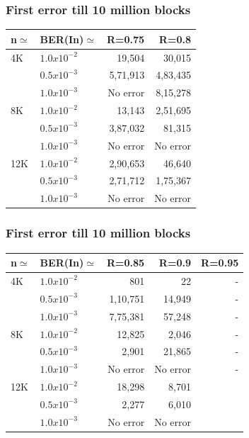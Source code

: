 \documentclass[xcolor=dvipsname]
{beamer}
\begin{document}
\begin{frame}[t] 
\frametitle{First error till 10 million blocks}

\begin{table}[]
\centering
\begin{tabular}{|l|l|r|r|}
\hline
n$\simeq$   & BER(In)$\simeq$    & R=0.75  & R=0.8  \\ \hline
4K  & $1.0x10^{-2}$  &  19,504   & 30,015           \\ \hline
    & $0.5x10^{-3}$ & 5,71,913    & 4,83,435         \\ \hline
    & $1.0x10^{-3}$   & No error  & 8,15,278        \\ \hline
8K  & $1.0x10^{-2}$   & 13,143   & 2,51,695        \\ \hline
    & $0.5x10^{-3}$ & 3,87,032     &  81,315       \\ \hline
    & $1.0x10^{-3}$   & No error   & No error                 \\ \hline
12K & $1.0x10^{-2}$   & 2,90,653   & 46,640          \\ \hline
    & $0.5x10^{-3}$ & 2,71,712     & 1,75,367        \\ \hline
    & $1.0x10^{-3}$   & No error   & No error        \\ \hline
  
\end{tabular}
\end{table}

\end{frame}

\begin{frame}[t] 
\frametitle{First error till 10 million blocks}

\begin{table}[]
\centering
\begin{tabular}{|l|l|r|r|r|}
\hline
n$\simeq$   & BER(In)$\simeq$    & R=0.85  & R=0.9 & R=0.95 \\ \hline
4K  & $1.0x10^{-2}$        & 801           &  22       & -      \\ \hline
    & $0.5x10^{-3}$       &  1,10,751     &   14,949             & -   \\ \hline
    & $1.0x10^{-3}$        & 7,75,381              &57,248        & -  \\ \hline
8K  & $1.0x10^{-2}$         & 12,825       &2,046        & -      \\ \hline
    & $0.5x10^{-3}$        & 2,901              &21,865           & -  \\ \hline
    & $1.0x10^{-3}$        & No error             & No error                & -             \\ \hline
12K & $1.0x10^{-2}$        & 18,298        & 8,701       &       \\ \hline
    & $0.5x10^{-3}$        & 2,277         & 6,010         &   \\ \hline
    & $1.0x10^{-3}$         & No error			  & No error            &    \\ \hline
   
\end{tabular}
\end{table}

\end{frame}

\end{document}
